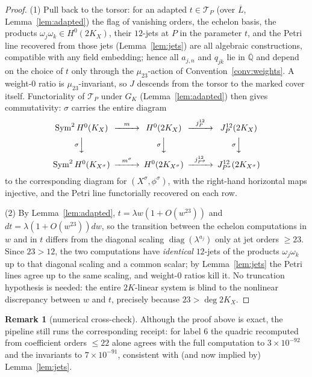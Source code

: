 \documentclass[11pt]{amsart}
\newcommand{\QQ}{\mathbb{Q}}
\newcommand{\GK}{G_{K}}
\newcommand{\Sym}{\operatorname{Sym}}
\theoremstyle{plain}
\theoremstyle{definition}
\newtheorem{remark}[theorem]{Remark}
\begin{document}
\begin{proof}
(1) Pull back to the torsor: for an adapted $t\in\mathscr{T}_P$
(over $\overline{L}$, Lemma~\ref{lem:adapted}) the flag of vanishing
orders, the echelon basis, the products
$\omega_j\omega_k\in H^0(2K_X)$, their $12$-jets at $P$ in the
parameter $t$, and the Petri line recovered from those jets
(Lemma~\ref{lem:jets}) are all algebraic constructions, compatible
with any field embedding; hence all $a_{j,n}$ and $q_{jk}$ lie in
$\overline{\QQ}$ and depend on the choice of $t$ only through the
$\mu_{23}$-action of Convention~\ref{conv:weights}. A weight-$0$
ratio is $\mu_{23}$-invariant, so $J$ descends from the torsor to
the marked cover itself. Functoriality of $\mathscr{T}_P$ under
$\GK$ (Lemma~\ref{lem:adapted}) then gives commutativity: $\sigma$
carries the entire diagram
\[
  \begin{CD}
    \Sym^2 H^0(K_X) @>{m}>> H^0(2K_X) @>{j^{12}_P}>>
      J^{12}_P(2K_X)\\
    @V{\sigma}VV @V{\sigma}VV @V{\sigma}VV\\
    \Sym^2 H^0(K_{X^\sigma}) @>{m^\sigma}>> H^0(2K_{X^\sigma})
      @>{j^{12}_{P^\sigma}}>> J^{12}_{P^\sigma}(2K_{X^\sigma})
  \end{CD}
\]
to the corresponding diagram for $(X^{\sigma},\phi^{\sigma})$, with
the right-hand horizontal maps injective, and the Petri line
functorially recovered on each row.

(2) By Lemma~\ref{lem:adapted}, $t=\lambda w(1+O(w^{23}))$ and
$dt=\lambda(1+O(w^{23}))dw$, so the transition between the echelon
computations in $w$ and in $t$ differs from the diagonal scaling
$\operatorname{diag}(\lambda^{a_j})$ only at jet orders $\ge 23$.
Since $23>12$, the two computations have \emph{identical} $12$-jets
of the products $\omega_j\omega_k$ up to that diagonal scaling and a
common scalar; by Lemma~\ref{lem:jets} the Petri lines agree up to
the same scaling, and weight-$0$ ratios kill it. No truncation
hypothesis is needed: the entire $2K$-linear system is blind to the
nonlinear discrepancy between $w$ and $t$, precisely because
$23>\deg 2K_X$.
\end{proof}

\begin{remark}[numerical cross-check]
Although the proof above is exact, the pipeline still runs the
corresponding receipt: for label $6$ the quadric recomputed from
coefficient orders $\le 22$ alone agrees with the full computation
to $3\times10^{-92}$ and the invariants to $7\times10^{-91}$,
consistent with (and now implied by) Lemma~\ref{lem:jets}.
\end{remark}
\end{document}
